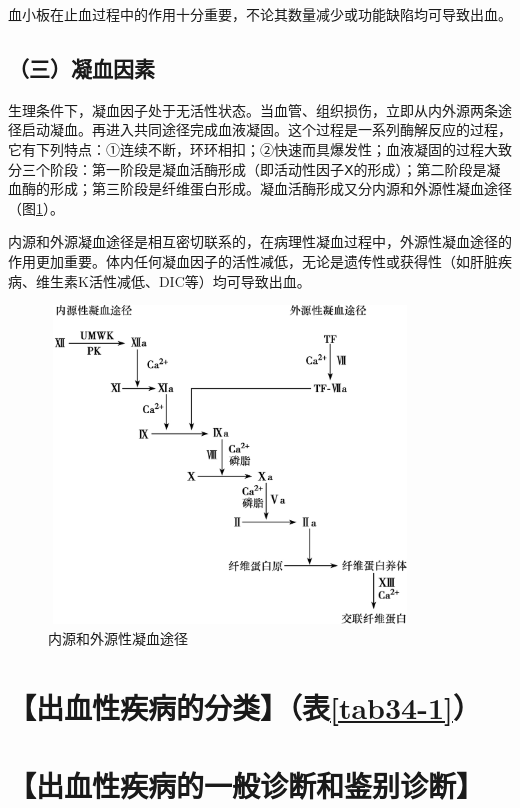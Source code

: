 血小板在止血过程中的作用十分重要，不论其数量减少或功能缺陷均可导致出血。

\subsection{（三）凝血因素}

生理条件下，凝血因子处于无活性状态。当血管、组织损伤，立即从内外源两条途径启动凝血。再进入共同途径完成血液凝固。这个过程是一系列酶解反应的过程，它有下列特点：①连续不断，环环相扣；②快速而具爆发性；血液凝固的过程大致分三个阶段：第一阶段是凝血活酶形成（即活动性因子Ⅹ的形成）；第二阶段是凝血酶的形成；第三阶段是纤维蛋白形成。凝血活酶形成又分内源和外源性凝血途径（图\ref{fig34-1}）。

内源和外源凝血途径是相互密切联系的，在病理性凝血过程中，外源性凝血途径的作用更加重要。体内任何凝血因子的活性减低，无论是遗传性或获得性（如肝脏疾病、维生素K活性减低、DIC等）均可导致出血。

\begin{figure}[!htbp]
 \centering
 \includegraphics[width=3.79167in,height=3.32292in]{./images/Image00192.jpg}
 \captionsetup{justification=centering}
 \caption{内源和外源性凝血途径}
 \label{fig34-1}
  \end{figure} 

\section{【出血性疾病的分类】（表\ref{tab34-1}）}

\section{【出血性疾病的一般诊断和鉴别诊断】}

